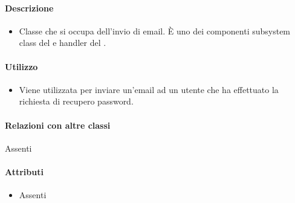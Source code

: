\paragraph*{Descrizione}
\begin{itemize}
\item[] Classe che si occupa dell'invio di email. È uno dei componenti subsystem class del   e handler del  .
\end{itemize}

\paragraph*{Utilizzo}
\begin{itemize}
\item[] Viene utilizzata per inviare un'email ad un utente che ha effettuato la richiesta di recupero password.
\end{itemize}

\paragraph*{Relazioni con altre classi}
Assenti

\paragraph*{Attributi}
\begin{itemize}
\item[] Assenti
\end{itemize}


